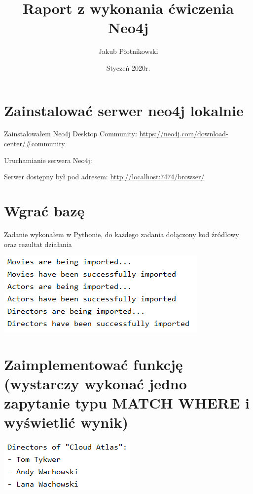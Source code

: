 \documentclass[a4paper, 11pt]{article}
\title{Raport z wykonania ćwiczenia Neo4j}
\author{Jakub Płotnikowski}
\date{Styczeń 2020r.}
\begin{document}
    \maketitle
    \tableofcontents

    \newpage

    \section{Zainstalować serwer neo4j lokalnie}

    Zainstalowałem Neo4j Desktop Community:
    \url{https://neo4j.com/download-center/#community}

    Uruchamianie serwera Neo4j:
    

    Serwer dostępny był pod adresem: \url{http://localhost:7474/browser/}

    \newpage

    \section{Wgrać bazę}

    Zadanie wykonałem w Pythonie, do każdego zadania dołączony kod źródłowy oraz rezultat działania

    

    \begin{center}
        \includegraphics[scale=0.8]{images/imports.png}
    \end{center}

    \newpage

    \section{ Zaimplementować funkcję (wystarczy wykonać jedno zapytanie typu MATCH WHERE i wyświetlić wynik)}

    

    \begin{center}
        \includegraphics{images/task3.png}
    \end{center}
\end{document}
